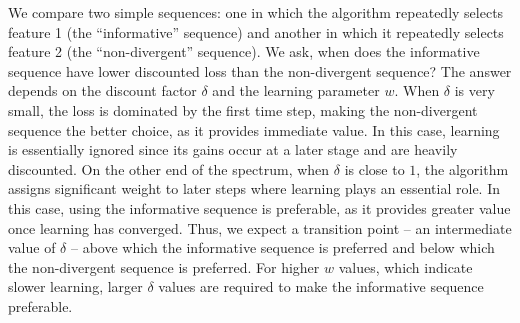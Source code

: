  
 We compare two simple sequences: one in which the algorithm repeatedly selects feature 1 (the ``informative'' sequence) and another in which it repeatedly selects feature 2 (the ``non-divergent'' sequence).  We ask, when does the informative sequence have lower discounted loss than the non-divergent sequence?
 The answer depends on the discount factor $\delta$ and the learning parameter $w$. {When \( \delta \) is very small, the loss is dominated by the first time step, making the non-divergent sequence the better choice, as it provides %
 immediate value. 
 In this case, learning is essentially ignored since its gains occur at a later stage and are heavily discounted.}
 On the other end of the spectrum, when $\delta$ is close to $1$, the algorithm assigns significant weight to later steps where learning plays {an essential} role. In this case, using the informative sequence is preferable, as it provides %
 {greater value} once learning has converged. Thus, we expect a transition point -- an intermediate value of $\delta$ -- above which the informative sequence is preferred and below which the non-divergent sequence is preferred. 
 For higher $w$ values, which indicate slower learning, larger $\delta$ values are required to make the informative sequence preferable.

 


